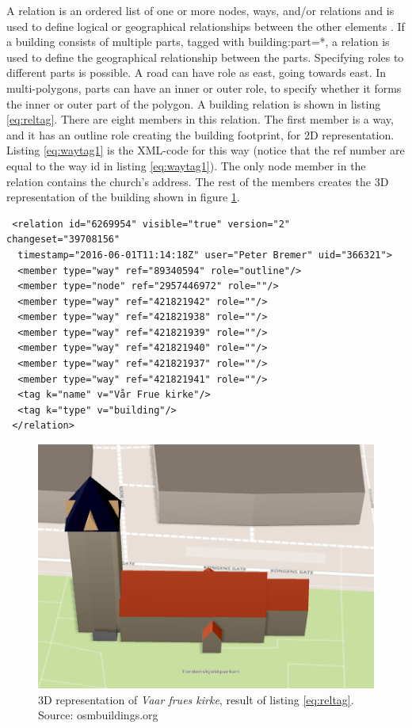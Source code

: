A relation is an ordered list of one or more nodes, ways, and/or relations and is used to define logical or geographical relationships between the other elements \cite{OpenStreetMape}. If a building consists of multiple parts, tagged with building:part=*, a relation is used to define the geographical relationship between the parts. Specifying roles to different parts is possible. A road can have role as east, going towards east. In multi-polygons, parts can have an inner or outer role, to specify whether it forms the inner or outer part of the polygon. A building relation is shown in listing \ref{eq:reltag}. There are eight members in this relation. The first member is a way, and it has an outline role creating the building footprint, for 2D representation. Listing \ref{eq:waytag1} is the XML-code for this way (notice that the ref number are equal to the way id in listing \ref{eq:waytag1}). The only node member in the relation contains the church's address. The rest of the members creates the 3D representation of the building shown in figure \ref{fig:fruekirke}.

\begin{lstlisting}
 <relation id="6269954" visible="true" version="2" changeset="39708156" 
  timestamp="2016-06-01T11:14:18Z" user="Peter Bremer" uid="366321">
  <member type="way" ref="89340594" role="outline"/>
  <member type="node" ref="2957446972" role=""/>
  <member type="way" ref="421821942" role=""/>
  <member type="way" ref="421821938" role=""/>
  <member type="way" ref="421821939" role=""/>
  <member type="way" ref="421821940" role=""/>
  <member type="way" ref="421821937" role=""/>
  <member type="way" ref="421821941" role=""/>
  <tag k="name" v="Vår Frue kirke"/>
  <tag k="type" v="building"/>
 </relation>
\end{lstlisting}

\begin{figure}[H]
    \centering
    \includegraphics[scale=0.5]{figures/FixedByMe/fruekirke.png}
    \caption{3D representation of \textit{Vaar frues kirke}, result of listing \ref{eq:reltag}. Source: osmbuildings.org}
    \label{fig:fruekirke}
\end{figure}


